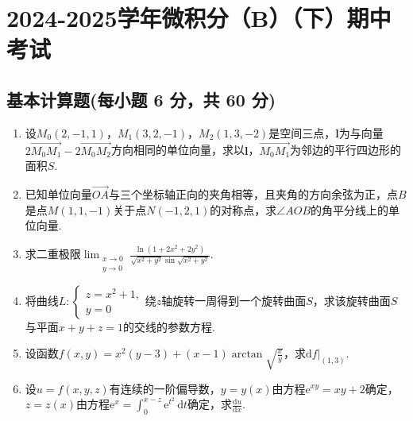 \documentclass[../Main.tex]{subfiles}
\begin{document}
\chapter{2024-2025学年微积分（B）（下）期中考试}

\section{基本计算题(每小题 6 分，共 60 分)}
\begin{enumerate}
    \item 设$M_{0}(2,-1,1)$，$M_{1}(3,2,-1)$，$M_{2}(1,3,-2)$是空间三点，$\boldsymbol
              {l}$为与向量$2\overrightarrow{M_0M_1}-2\overrightarrow{M_0M_2}$方向相同的单位向量，求以$\boldsymbol
              {l}$，$\overrightarrow{M_0M_1}$为邻边的平行四边形的面积$S$.
          \vspace{10em}

    \item 已知单位向量$\overrightarrow{OA}$与三个坐标轴正向的夹角相等，且夹角的方向余弦为正，点$B$是点$M
              (1,1,-1)$关于点$N(-1,2,1)$的对称点，求$\angle AOB$的角平分线上的单位向量.
          \vspace{10em}

    \item 求二重极限$\lim_{\substack{x\to 0 \\ y\to 0}}\frac{\ln\left(1+2x^{2}+2y^{2}\right)}{\sqrt{x^{2}+y^{2}}\sin\sqrt{x^{2}+y^{2}}}$.
          \vspace{10em}

    \item 将曲线$L:
              \begin{cases}
                  z=x^{2}+1, \\
                  y=0
              \end{cases}$绕$z$轴旋转一周得到一个旋转曲面$S$，求该旋转曲面$S$与平面$x+y+z
              =1$的交线的参数方程.
          \vspace{12em}

    \item 设函数$f(x,y)=x^{2}(y-3)+(x-1)\arctan\sqrt{\frac{x}{y}}$，求$\left.\mathrm{d}
              f\right|_{(1,3)}$.
          \vspace{12em}

    \item 设$u=f(x,y,z)$有连续的一阶偏导数，$y=y(x)$由方程$\mathrm{e}^{xy}=xy+2$确定，$z
              =z(x)$由方程$\mathrm{e}^{x} = \int_{0}^{x-z}\mathrm{e}^{t^2}\,\mathrm{d}t$确定，求$\frac{\mathrm{d}u}{\mathrm{d}x}$.
          \vspace{12em}


\end{enumerate}
\end{document}
